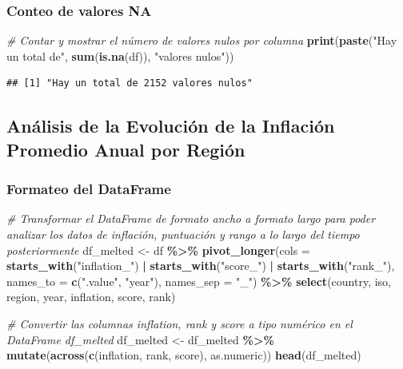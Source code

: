 \documentclass[
]{article}
\newenvironment{Shaded}{\begin{snugshade}}{\end{snugshade}}
\newcommand{\AttributeTok}[1]{\textcolor[rgb]{0.13,0.29,0.53}{#1}}
\newcommand{\CommentTok}[1]{\textcolor[rgb]{0.56,0.35,0.01}{\textit{#1}}}
\newcommand{\FunctionTok}[1]{\textcolor[rgb]{0.13,0.29,0.53}{\textbf{#1}}}
\newcommand{\NormalTok}[1]{#1}
\newcommand{\OtherTok}[1]{\textcolor[rgb]{0.56,0.35,0.01}{#1}}
\newcommand{\SpecialCharTok}[1]{\textcolor[rgb]{0.81,0.36,0.00}{\textbf{#1}}}
\newcommand{\StringTok}[1]{\textcolor[rgb]{0.31,0.60,0.02}{#1}}
\begin{document}
\subsubsection{Conteo de valores NA}\label{conteo-de-valores-na}

\begin{Shaded}
\begin{Highlighting}[]
\CommentTok{\# Contar y mostrar el número de valores nulos por columna}
\FunctionTok{print}\NormalTok{(}\FunctionTok{paste}\NormalTok{(}\StringTok{"Hay un total de"}\NormalTok{, }\FunctionTok{sum}\NormalTok{(}\FunctionTok{is.na}\NormalTok{(df)), }\StringTok{"valores nulos"}\NormalTok{))}
\end{Highlighting}
\end{Shaded}

\begin{verbatim}
## [1] "Hay un total de 2152 valores nulos"
\end{verbatim}

\subsection{Análisis de la Evolución de la Inflación Promedio Anual por
Región}\label{analisis-de-la-evoluciuxf3n-de-la-inflacion-promedio-anual-por-region}

\subsubsection{Formateo del DataFrame}\label{formateo-del-dataFrame}

\begin{Shaded}
\begin{Highlighting}[]
\CommentTok{\# Transformar el DataFrame de formato ancho a formato largo para poder analizar los datos de inflación, puntuación y rango a lo largo del tiempo posteriormente}
\NormalTok{df\_melted }\OtherTok{\textless{}{-}}\NormalTok{ df }\SpecialCharTok{\%\textgreater{}\%}
  \FunctionTok{pivot\_longer}\NormalTok{(}\AttributeTok{cols =} \FunctionTok{starts\_with}\NormalTok{(}\StringTok{"inflation\_"}\NormalTok{) }\SpecialCharTok{|} \FunctionTok{starts\_with}\NormalTok{(}\StringTok{"score\_"}\NormalTok{) }\SpecialCharTok{|} \FunctionTok{starts\_with}\NormalTok{(}\StringTok{"rank\_"}\NormalTok{),}
  \AttributeTok{names\_to =} \FunctionTok{c}\NormalTok{(}\StringTok{".value"}\NormalTok{, }\StringTok{"year"}\NormalTok{),}
  \AttributeTok{names\_sep =} \StringTok{"\_"}\NormalTok{) }\SpecialCharTok{\%\textgreater{}\%}
\FunctionTok{select}\NormalTok{(country, iso, region, year, inflation, score, rank)}

\CommentTok{\# Convertir las columnas \textquotesingle{}inflation\textquotesingle{}, \textquotesingle{}rank\textquotesingle{} y \textquotesingle{}score\textquotesingle{} a tipo numérico en el DataFrame df\_melted}
\NormalTok{df\_melted }\OtherTok{\textless{}{-}}\NormalTok{ df\_melted }\SpecialCharTok{\%\textgreater{}\%}
    \FunctionTok{mutate}\NormalTok{(}\FunctionTok{across}\NormalTok{(}\FunctionTok{c}\NormalTok{(inflation, rank, score), as.numeric))}
\FunctionTok{head}\NormalTok{(df\_melted)}
\end{Highlighting}
\end{Shaded}
\end{document}
